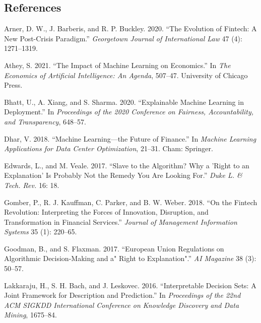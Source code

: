 \documentclass[
  letterpaper,
  DIV=11,
  numbers=noendperiod]{scrartcl}
\newlength{\cslhangindent}
\newlength{\cslentryspacingunit} %
\newenvironment{CSLReferences}[2] %
 {%
  \setlength{\parindent}{0pt}
  \ifodd #1
  \let\oldpar\par
  \def\par{\hangindent=\cslhangindent\oldpar}
  \fi
  \setlength{\parskip}{#2\cslentryspacingunit}
 }%
 {}
\begin{document}
\hypertarget{references}{%
\subsection*{References}\label{references}}

\hypertarget{refs}{}
\begin{CSLReferences}{1}{0}
\leavevmode{}%
Arner, D. W., J. Barberis, and R. P. Buckley. 2020. {``The Evolution of
Fintech: A New Post-Crisis Paradigm.''} \emph{Georgetown Journal of
International Law} 47 (4): 1271--1319.

\leavevmode{}%
Athey, S. 2021. {``The Impact of Machine Learning on Economics.''} In
\emph{The Economics of Artificial Intelligence: An Agenda}, 507--47.
University of Chicago Press.

\leavevmode{}%
Bhatt, U., A. Xiang, and S. Sharma. 2020. {``Explainable Machine
Learning in Deployment.''} In \emph{Proceedings of the 2020 Conference
on Fairness, Accountability, and Transparency}, 648--57.

\leavevmode{}%
Dhar, V. 2018. {``Machine Learning---the Future of Finance.''} In
\emph{Machine Learning Applications for Data Center Optimization},
21--31. Cham: Springer.

\leavevmode{}%
Edwards, L., and M. Veale. 2017. {``Slave to the Algorithm? Why a 'Right
to an Explanation' Is Probably Not the Remedy You Are Looking For.''}
\emph{Duke L. \& Tech. Rev.} 16: 18.

\leavevmode{}%
Gomber, P., R. J. Kauffman, C. Parker, and B. W. Weber. 2018. {``On the
Fintech Revolution: Interpreting the Forces of Innovation, Disruption,
and Transformation in Financial Services.''} \emph{Journal of Management
Information Systems} 35 (1): 220--65.

\leavevmode{}%
Goodman, B., and S. Flaxman. 2017. {``European Union Regulations on
Algorithmic Decision-Making and a" Right to Explanation".''} \emph{AI
Magazine} 38 (3): 50--57.

\leavevmode{}%
Lakkaraju, H., S. H. Bach, and J. Leskovec. 2016. {``Interpretable
Decision Sets: A Joint Framework for Description and Prediction.''} In
\emph{Proceedings of the 22nd ACM SIGKDD International Conference on
Knowledge Discovery and Data Mining}, 1675--84.


\end{CSLReferences}
\end{document}
